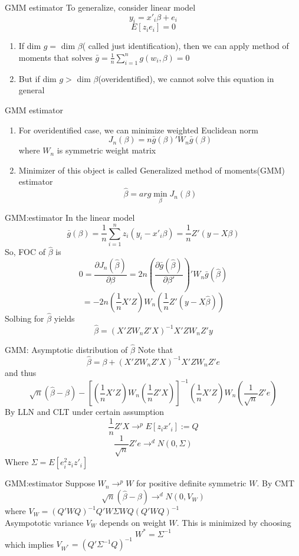 \documentclass{beamer}
\begin{document}
\begin{frame}{GMM estimator}
	To generalize, consider linear model
	\[y_i = x'_i \beta + e_i\]
	\[E[z_i e_i] = 0\]
\begin{enumerate}
	\item If dim $g= $  dim $\beta$( called just identification), then we can apply method of moments that solves $\bar{g} = \frac{1}{n} \sum^n_{i=1} g(w_i,\beta) = 0$
	\item But if dim $g > $ dim $\beta $(overidentified), we cannot solve this equation in general
\end{enumerate}
\end{frame}
\begin{frame}{GMM estimator}
	\begin{enumerate}
	\item For overidentified case, we can minimize weighted Euclidean norm
	\[J_n(\beta) = n\bar{g}(\beta)' W_n \bar{g}(\beta)\]
where $W_n$ is symmetric weight matrix
	\item Minimizer of this object is called Generalized method of moments(GMM) estimator
		\[\hat{\beta} = arg \min_{\beta} J_n(\beta)\]
	\end{enumerate}
\end{frame}
\begin{frame}{GMM:estimator}
	In the linear model
	\[\bar{g}(\beta) = \frac{1}{n} \sum^n_{i=1} z_i (y_i - x'_i \beta) = \frac{1}{n} Z'(y-X\beta)\]
	So, FOC of $\hat{\beta}$ is 
	\[0 = \frac{\partial J_n(\hat{\beta})}{\partial \beta} = 2n (\frac{\partial \bar{g}(\hat{\beta})}{\partial \beta'})' W_n \bar{g}(\hat{\beta})\]
	\[= -2n(\frac{1}{n} X' Z) W_n (\frac{1}{n} Z'(y - X \hat{\beta}))\]
	Solbing for $\hat{\beta}$ yields
	\[\hat{\beta} = (X'ZW_n Z' X)^{-1} X'ZW_nZ'y\]
\end{frame}
\begin{frame}{GMM: Asymptotic distribution of $\hat{\beta}$}
	Note that 
	\[\hat{\beta} = \beta + (X'ZW_n Z' X)^{-1} X'ZW_nZ' e\]
	and thus
	\[\sqrt{n} (\hat{\beta} - \beta) - [(\frac{1}{n} X' Z) W_n (\frac{1}{n} Z'X)]^{-1} (\frac{1}{n} X'Z) W_n (\frac{1}{\sqrt{n}} Z' e)\]
	By LLN and CLT under certain assumption
	\[\frac{1}{n} Z'X \rightarrow^p E[z_ix'_i] :=Q\]
	\[\frac{1}{\sqrt{n}} Z'e \rightarrow^d N(0, \Sigma)\]
	Where $\Sigma = E[e^2_i z_i z'_i]$
\end{frame}
\begin{frame}{GMM:estimator}
	Suppose $W_n \rightarrow^p W$ for positive definite symmetric $W$. By CMT
	\[\sqrt{n} (\hat{\beta} - \beta) \rightarrow^d N(0,V_W)\]
	where $V_W = (Q'WQ)^{-1} Q'W\Sigma WQ(Q'WQ)^{-1}$ \\
	Asympototic variance $V_W$ depends on weight $W$. This is minimized by choosing
	\[W^* = \Sigma^{-1}\]
	which implies $V_{W^*} = (Q'\Sigma^{-1}Q)^{-1}$ 
\end{frame}
\end{document}
